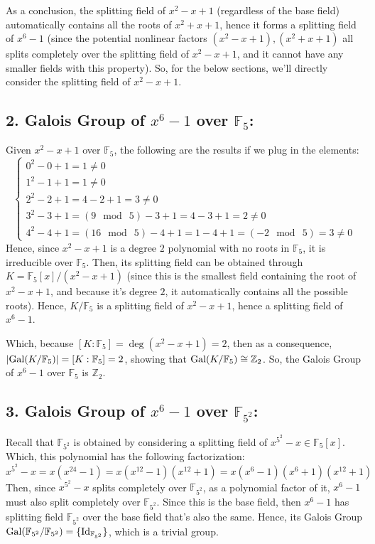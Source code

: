 \documentclass{article}
\newcommand{\FF}{\mathbb{F}}
\newcommand{\ZZ}{\mathbb{Z}}
\newcommand{\Id}{\textmd{Id}}
\newcommand{\Gal}{\textmd{Gal}}
\begin{document}
As a conclusion, the splitting field of $x^2-x+1$ (regardless of the base field) automatically contains all the roots of $x^2+x+1$, hence it forms a splitting field of $x^6-1$ (since the potential nonlinear factors $(x^2-x+1),(x^2+x+1)$ all splits completely over the splitting field of $x^2-x+1$, and it cannot have any smaller fields with this property). So, for the below sections, we'll directly consider the splitting field of $x^2-x+1$.

\subsection*{2. Galois Group of $x^6-1$ over $\FF_5$:}
Given $x^2-x+1$ over $\FF_5$, the following are the results if we plug in the elements:
\begin{equation}
    \label{eq:11}
    \begin{cases}
        0^2-0+1 = 1\neq 0\\
        1^2-1+1 = 1\neq 0\\
        2^2-2+1 = 4-2+1 = 3\neq 0\\
        3^2-3+1 = (9\mod\ 5)-3+1 = 4-3+1 = 2\neq 0\\
        4^2-4+1 = (16\mod\ 5)-4+1 = 1-4+1 = (-2\mod\ 5) = 3\neq 0
    \end{cases}
\end{equation}
Hence, since $x^2-x+1$ is a degree $2$ polynomial with no roots in $\FF_5$, it is irreducible over $\FF_5$. Then, its splitting field can be obtained through $K=\FF_5[x]/(x^2-x+1)$ (since this is the smallest field containing the root of $x^2-x+1$, and because it's degree $2$, it automatically contains all the possible roots). Hence, $K/\FF_5$ is a splitting field of $x^2-x+1$, hence a splitting field of $x^6-1$. 

Which, because $[K:\FF_5]=\deg(x^2-x+1)=2$, then as a consequence, $|\Gal(K/\FF_5)| = [K:\FF_5]=2$, showing that $\Gal(K/\FF_5)\cong \ZZ_2$. So, the Galois Group of $x^6-1$ over $\FF_5$ is $\ZZ_2$.

\subsection*{3. Galois Group of $x^6-1$ over $\FF_{5^2}$:}
Recall that $\FF_{5^2}$ is obtained by considering a splitting field of $x^{5^2}-x\in \FF_5[x]$. Which, this polynomial has the following factorization:
\begin{equation}
    x^{5^2}-x = x(x^{24}-1) = x(x^{12}-1)(x^{12}+1) = x(x^6-1)(x^6+1)(x^{12}+1)
\end{equation}
Then, since $x^{5^2}-x$ splits completely over $\FF_{5^2}$, as a polynomial factor of it, $x^6-1$ must also split completely over $\FF_{5^2}$. Since this is the base field, then $x^6-1$ has splitting field $\FF_{5^2}$ over the base field that's also the same. Hence, its Galois Group $\Gal(\FF_{5^2}/\FF_{5^2}) = \{\Id_{\FF_{5^2}}\}$, which is a trivial group.
\end{document}
